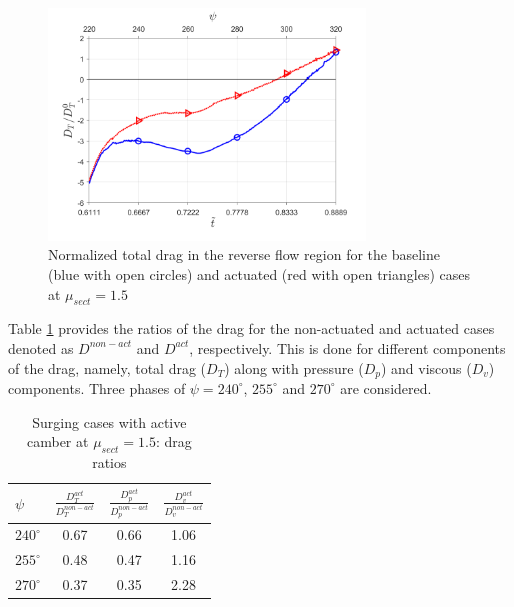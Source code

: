 \begin{figure}[H]
	
	\centering
	\includegraphics[width=0.75\textwidth]{figures/Zoomed_Drag_tot_NACA0012_Re1m_aoa10_1pt5_3.png}
	\caption{Normalized total drag in the reverse flow region for the baseline (blue with open circles) and actuated (red with open triangles) cases at $\mu_{sect}=1.5$}
	\label{fig:total_drag_zoomed_mu_1pt5}
\end{figure}


%




Table \ref{table:D_ratios_mu_1pt5} provides the ratios of the drag for the non-actuated and actuated cases denoted as $D^{non-act}$ and $D^{act}$, respectively.
This is done for different components of the drag, namely, total drag ($D_T$) along with pressure ($D_p$) and viscous ($D_v$) components.
Three phases of $\psi=240^\circ$, $255^\circ$ and $270^\circ$ are considered.


\begin{table}[H]
	\vspace{0cm}
	\centering
	\caption{Surging cases with active camber at $\mu_{sect} = 1.5$: drag ratios}
	\label{table:D_ratios_mu_1pt5}
	\begin{tabular}{|l|c|c|c|}
		\hline
		$ \psi$   & {\large $\frac{D^{act}_{T}}{D^{non-act}_{T}}$} & {\large $\frac{D^{act}_{p}}{D^{non-act}_{p}}$} & {\large $\frac{D^{act}_{v}}{D^{non-act}_{v}}$} \\
		\hline
		\hline
		$240^\circ$ & 0.67 & 0.66 & 1.06   \\
		\hline
		$255^\circ$ & 0.48 & 0.47 & 1.16   \\
		\hline
		$270^\circ$ & 0.37 & 0.35 & 2.28   \\
		\hline
	\end{tabular}
\end{table}

